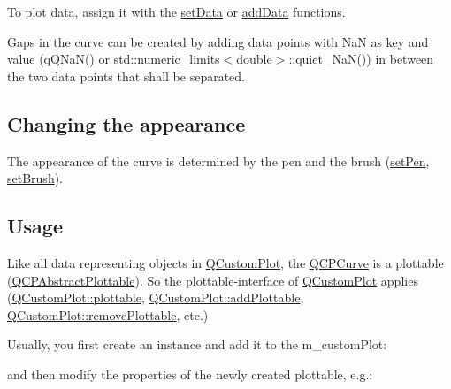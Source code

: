 \-To plot data, assign it with the \hyperlink{classQCPCurve_a631ac886708460013b30052f49cbc9da}{set\-Data} or \hyperlink{classQCPCurve_a4e24023c3b9ac75440c7a260172c99af}{add\-Data} functions.

\-Gaps in the curve can be created by adding data points with \-Na\-N as key and value ({\ttfamily q\-Q\-Na\-N()} or {\ttfamily std\-::numeric\-\_\-limits$<$double$>$\-::quiet\-\_\-\-Na\-N()}) in between the two data points that shall be separated.\hypertarget{classQCPStatisticalBox_appearance}{}\subsection{\-Changing the appearance}\label{classQCPStatisticalBox_appearance}
\-The appearance of the curve is determined by the pen and the brush (\hyperlink{classQCPAbstractPlottable_ab74b09ae4c0e7e13142fe4b5bf46cac7}{set\-Pen}, \hyperlink{classQCPAbstractPlottable_a7a4b92144dca6453a1f0f210e27edc74}{set\-Brush}). \hypertarget{classQCPStatisticalBox_usage}{}\subsection{\-Usage}\label{classQCPStatisticalBox_usage}
\-Like all data representing objects in \hyperlink{classQCustomPlot}{\-Q\-Custom\-Plot}, the \hyperlink{classQCPCurve}{\-Q\-C\-P\-Curve} is a plottable (\hyperlink{classQCPAbstractPlottable}{\-Q\-C\-P\-Abstract\-Plottable}). \-So the plottable-\/interface of \hyperlink{classQCustomPlot}{\-Q\-Custom\-Plot} applies (\hyperlink{classQCustomPlot_a32de81ff53e263e785b83b52ecd99d6f}{\-Q\-Custom\-Plot\-::plottable}, \hyperlink{classQCustomPlot_ab7ad9174f701f9c6f64e378df77927a6}{\-Q\-Custom\-Plot\-::add\-Plottable}, \hyperlink{classQCustomPlot_af3dafd56884208474f311d6226513ab2}{\-Q\-Custom\-Plot\-::remove\-Plottable}, etc.)

\-Usually, you first create an instance and add it to the m\-\_\-custom\-Plot\-: 
\begin{DoxyCodeInclude}
\end{DoxyCodeInclude}
 and then modify the properties of the newly created plottable, e.\-g.\-: 
\begin{DoxyCodeInclude}
\end{DoxyCodeInclude}


